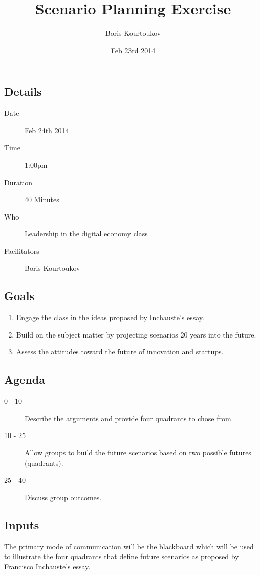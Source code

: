
\title{Scenario Planning Exercise}
\author{Boris Kourtoukov}
\date{Feb 23rd 2014}

\maketitle
\subsection{Details}
\begin{description}
  \item[Date] Feb 24th 2014
  \item[Time] 1:00pm
  \item[Duration] 40 Minutes
  \item[Who] Leadership in the digital economy class
  \item[Facilitators] Boris Kourtoukov
\end{description}
\subsection{Goals} 
\begin{enumerate}
	\item Engage the class in the ideas proposed by Inchauste's essay.
	\item Build on the subject matter by projecting scenarios 20 years into the future.
	\item Assess the attitudes toward the future of innovation and startups.
\end{enumerate}
\subsection{Agenda} 
\begin{description}
  \item[0 - 10] Describe the arguments and provide four quadrants to chose from
  \item[10 - 25] Allow groups to build the future scenarios based on two possible futures (quadrants).
  \item[25 - 40] Discuss group outcomes.
\end{description}
\subsection{Inputs}
The primary mode of communication will be the blackboard which will be used to illustrate the four quadrants that define future scenarios as proposed by Francisco Inchauste's essay.
